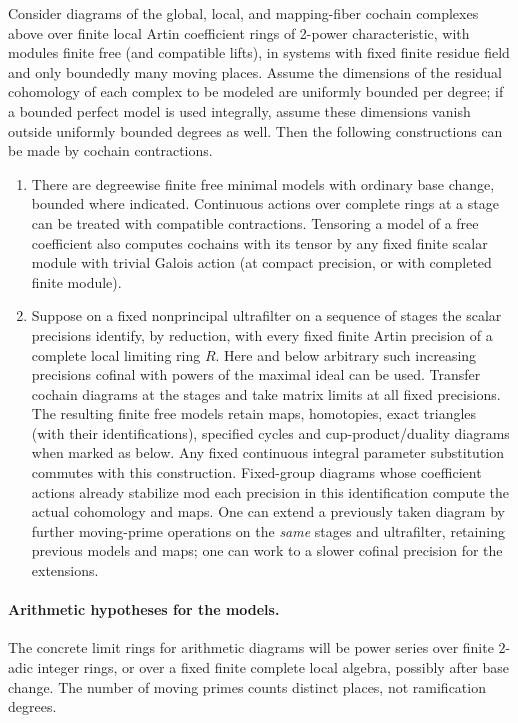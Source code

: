 \begin{lemma}\label{lem:foundations-finite} Consider diagrams of the global, local, and mapping-fiber cochain complexes above over finite local Artin coefficient rings of 2-power characteristic, with modules finite free (and compatible lifts), in systems with fixed finite residue field and only boundedly many moving places. Assume the dimensions of the residual cohomology of each complex to be modeled are uniformly bounded per degree; if a bounded perfect model is used integrally, assume these dimensions vanish outside uniformly bounded degrees as well. Then the following constructions can be made by cochain contractions.

\begin{enumerate}
\item There are degreewise finite free minimal models with ordinary base change, bounded where indicated. Continuous actions over complete rings at a stage can be treated with compatible contractions. Tensoring a model of a free coefficient also computes cochains with its tensor by any fixed finite scalar module with trivial Galois action (at compact precision, or with completed finite module).
\item Suppose on a fixed nonprincipal ultrafilter on a sequence of stages the scalar precisions identify, by reduction, with every fixed finite Artin precision of a complete local limiting ring \(R\). Here and below arbitrary such increasing precisions cofinal with powers of the maximal ideal can be used. Transfer cochain diagrams at the stages and take matrix limits at all fixed precisions. The resulting finite free models retain maps, homotopies, exact triangles (with their identifications), specified cycles and cup-product/duality diagrams when marked as below. Any fixed continuous integral parameter substitution commutes with this construction. Fixed-group diagrams whose coefficient actions already stabilize mod each precision in this identification compute the actual cohomology and maps. One can extend a previously taken diagram by further moving-prime operations on the \emph{same} stages and ultrafilter, retaining previous models and maps; one can work to a slower cofinal precision for the extensions.
\end{enumerate}

\end{lemma}

\paragraph{Arithmetic hypotheses for the models.}
The concrete limit rings for arithmetic diagrams will be power series over finite \(2\)-adic integer rings, or over a fixed finite complete local algebra, possibly after base change. The number of moving primes counts distinct places, not ramification degrees.

